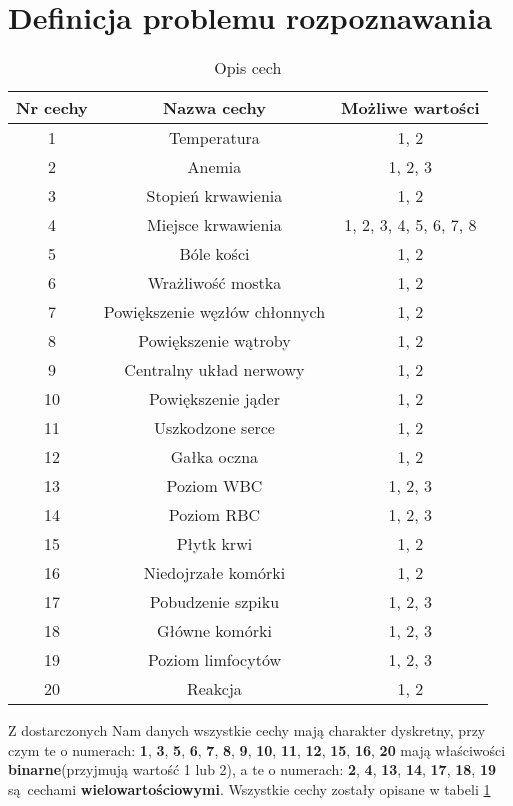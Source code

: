 \section{Definicja problemu rozpoznawania}
	
	\begin{table}[h!]
		\centering
		\begin{tabular}{|| c | c | c ||} 
			\hline
			Nr cechy & Nazwa cechy & Możliwe wartości \\ [0.5ex] 
			\hline\hline
			1 & Temperatura & 1, 2 \\ 
			2 & Anemia & 1, 2, 3 \\
			3 & Stopień krwawienia & 1, 2 \\
			4 & Miejsce krwawienia & 1, 2, 3, 4, 5, 6, 7, 8 \\
			5 & Bóle kości & 1, 2 \\
			6 & Wrażliwość mostka & 1, 2 \\
			7 & Powiększenie węzłów chłonnych & 1, 2 \\
			8 & Powiększenie wątroby & 1, 2 \\
			9 & Centralny układ nerwowy & 1, 2 \\
			10 & Powiększenie jąder & 1, 2 \\
			11 & Uszkodzone serce & 1, 2 \\
			12 & Gałka oczna & 1, 2 \\
			13 & Poziom WBC & 1, 2, 3 \\
			14 & Poziom RBC & 1, 2, 3 \\
			15 & Płytk krwi & 1, 2 \\
			16 & Niedojrzałe komórki & 1, 2 \\
			17 & Pobudzenie szpiku & 1, 2, 3 \\
			18 & Główne komórki & 1, 2, 3 \\
			19 & Poziom limfocytów & 1, 2, 3 \\
			20 & Reakcja & 1, 2 \\ [1ex] 
			\hline
		\end{tabular}
		\caption{Opis cech}
		\label{1}
	\end{table}

	Z dostarczonych Nam danych wszystkie cechy mają charakter dyskretny, przy czym te o numerach: \textbf{1}, \textbf{3}, \textbf{5}, \textbf{6}, \textbf{7}, \textbf{8}, \textbf{9}, \textbf{10}, \textbf{11}, \textbf{12}, \textbf{15}, \textbf{16}, \textbf{20} mają właściwości \textbf{binarne}(przyjmują wartość 1 lub 2), a te o numerach: \textbf{2}, \textbf{4}, \textbf{13}, \textbf{14}, \textbf{17}, \textbf{18}, \textbf{19} są cechami \textbf{wielowartościowymi}. Wszystkie cechy zostały opisane w tabeli \ref{1}
	
